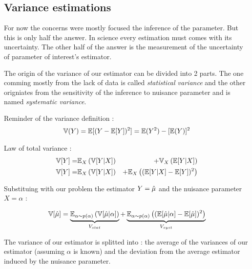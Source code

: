\subsection{Variance estimations} %
\label{sub:variance_estimations}


For now the concerns were mostly focused the inference of the parameter.
But this is only half the answer.
In science every estimation must comes with its uncertainty.
The other half of the answer is the measurement of the uncertainty of parameter of interest's estimator.

The origin of the variance of our estimator can be divided into 2 parts.
The one comming mostly from the lack of data is called \emph{statistical variance} and the other origniates from the sensitivity of the inference to nuisance parameter and is named \emph{systematic variance}.

Reminder of the variance definition :
\begin{equation}
	\mathbb{V}(Y) = \mathbb{E}[(Y - \mathbb{E}[Y])^2] = \mathbb{E}(Y^2) - [\mathbb{E}(Y)]^2
\end{equation}

Law of total variance \needcite :
\begin{eqnarray}
\label{eq:total_variance_law}
    \mathbb{V}[Y] =& \mathbb{E}_X \left (\mathbb{V}[Y|X] \right ) &+ \mathbb{V}_X \left (\mathbb{E}[Y|X]\right ) \\
    \mathbb{V}[Y] =& \mathbb{E}_X \left (\mathbb{V}[Y|X] \right ) &+ \mathbb{E}_X \left ( (\mathbb{E} [Y|X]  - \mathbb{E}[Y])^2\right )
\end{eqnarray}


Substituing with our problem the estimator $Y = \hat\mu$ and the nuisance parameter $X = \alpha$ :

\begin{equation}
\label{eq:stat_and_syst_variance_definition}
\mathbb{V}[\hat\mu] 
	= \underbrace{\mathbb{E}_{\alpha \sim p(\alpha)} \left (\mathbb{V}[\hat\mu | \alpha] \right )}_{V_{stat}} 
	+ \underbrace{\mathbb{E}_{\alpha \sim p(\alpha)} \left ( (\mathbb{E} [\hat\mu | \alpha]  - \mathbb{E}[\hat\mu])^2\right )}_{V_{syst}}
\end{equation}

The variance of our estimator is splitted into :
the average of the variances of our estimator (assuming $\alpha$ is known) and the deviation from the average estimator induced by the nuisance parameter.

